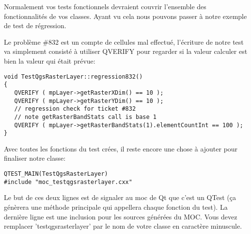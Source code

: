 % 
Normalement vos tests fonctionnels devraient couvrir l'ensemble des fonctionnalit\'es de vos classes. Ayant vu cela nous pouvons passer \`a notre exemple de test de r\'egression.

Le probl\`eme \#832 est un compte de cellules mal effectu\'e, l'\'ecriture de notre test va simplement consist\'e \`a utiliser QVERIFY pour regarder si la valeur calculer est bien la valeur qui \'etait pr\'evue:

\begin{verbatim}
void TestQgsRasterLayer::regression832()
{
   QVERIFY ( mpLayer->getRasterXDim() == 10 );
   QVERIFY ( mpLayer->getRasterYDim() == 10 );
   // regression check for ticket #832
   // note getRasterBandStats call is base 1
   QVERIFY ( mpLayer->getRasterBandStats(1).elementCountInt == 100 );
}
\end{verbatim}

Avec toutes les fonctions du test cr\'ees, il reste encore une chose \`a ajouter pour finaliser notre classe:

\begin{verbatim}
QTEST_MAIN(TestQgsRasterLayer)
#include "moc_testqgsrasterlayer.cxx"
\end{verbatim}

Le but de ces deux lignes est de signaler au moc de Qt que c'est un QTest (\c{c}a g\'en\`erera une m\'ethode principale qui appellera chaque fonction du test). La derni\`ere ligne est une inclusion pour les sources g\'en\'er\'ees du MOC. Vous devez remplacer 'testqgsrasterlayer' par le nom de votre classe en caract\`ere minuscule.

